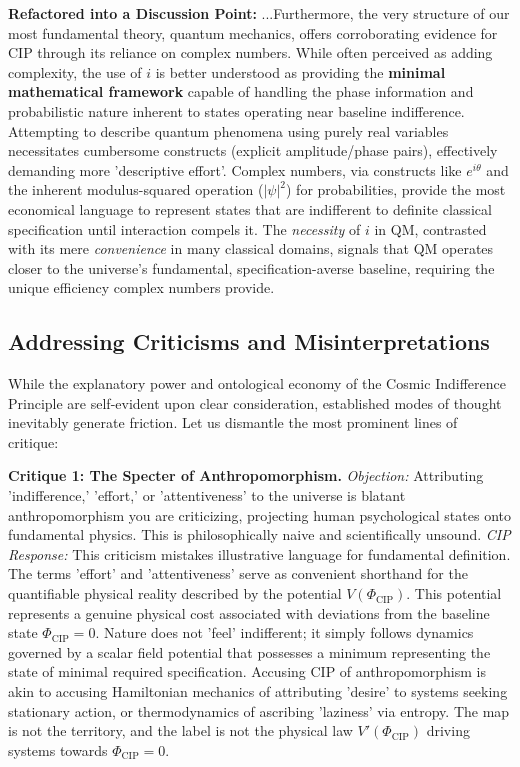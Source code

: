 \documentclass[11pt, a4paper]{article}
\newcommand{\subt}[1]{\mathrm{#1}}
\begin{document}
\textbf{Refactored into a Discussion Point:}
...Furthermore, the very structure of our most fundamental theory, quantum mechanics, offers corroborating evidence for CIP through its reliance on complex numbers. While often perceived as adding complexity, the use of $i$ is better understood as providing the \textbf{minimal mathematical framework} capable of handling the phase information and probabilistic nature inherent to states operating near baseline indifference. Attempting to describe quantum phenomena using purely real variables necessitates cumbersome constructs (explicit amplitude/phase pairs), effectively demanding more 'descriptive effort'. Complex numbers, via constructs like $e^{i\theta}$ and the inherent modulus-squared operation ($|\psi|^2$) for probabilities, provide the most economical language to represent states that are indifferent to definite classical specification until interaction compels it. The \textit{necessity} of $i$ in QM, contrasted with its mere \textit{convenience} in many classical domains, signals that QM operates closer to the universe's fundamental, specification-averse baseline, requiring the unique efficiency complex numbers provide.

\subsection{Addressing Criticisms and Misinterpretations} \label{sec:critiques}

While the explanatory power and ontological economy of the Cosmic Indifference Principle are self-evident upon clear consideration, established modes of thought inevitably generate friction. Let us dismantle the most prominent lines of critique:

\textbf{Critique 1: The Specter of Anthropomorphism.}
\textit{Objection:} Attributing 'indifference,' 'effort,' or 'attentiveness' to the universe is blatant anthropomorphism you are criticizing, projecting human psychological states onto fundamental physics. This is philosophically naive and scientifically unsound.
\textit{CIP Response:} This criticism mistakes illustrative language for fundamental definition. The terms 'effort' and 'attentiveness' serve as convenient shorthand for the quantifiable physical reality described by the potential $V(\Phi_{\subt{CIP}})$. This potential represents a genuine physical cost associated with deviations from the baseline state $\Phi_{\subt{CIP}}=0$. Nature does not 'feel' indifferent; it simply follows dynamics governed by a scalar field potential that possesses a minimum representing the state of minimal required specification. Accusing CIP of anthropomorphism is akin to accusing Hamiltonian mechanics of attributing 'desire' to systems seeking stationary action, or thermodynamics of ascribing 'laziness' via entropy. The map is not the territory, and the label is not the physical law $V'(\Phi_{\subt{CIP}})$ driving systems towards $\Phi_{\subt{CIP}}=0$.
\end{document}
